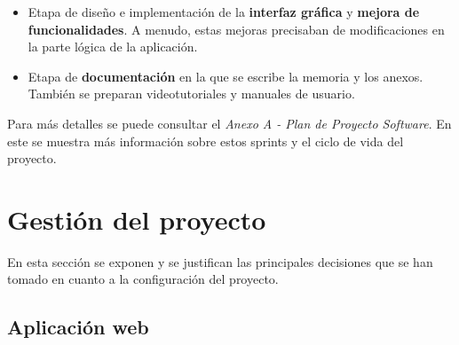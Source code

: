 \begin{itemize}
\begin{itemize}
			\item Configurar badges \footnote{Son placas que aportan información rápida sobre el estado del proyecto en ciertos aspectos como la cobertura, la calidad de código o el estado del proceso de CI/CD} para representar el estado del proyecto en cuanto a calidad de código, cobertura, despliegue y los trabajos de CI/CD.
		\end{itemize}
	\item Etapa  de diseño e implementación de la \textbf{interfaz gráfica} y \textbf{mejora de funcionalidades}. A menudo, estas mejoras precisaban de modificaciones en la parte lógica de la aplicación.
	\item Etapa de \textbf{documentación} en la que se escribe la memoria y los anexos. También se preparan videotutoriales y manuales de usuario.
\end{itemize}

Para más detalles se puede consultar el \textit{Anexo A - Plan de Proyecto Software}. En este se muestra más información sobre estos sprints y el ciclo de vida del proyecto.

\section{Gestión del proyecto}

En esta sección se exponen y se justifican las principales decisiones que se han tomado en cuanto a la configuración del proyecto.

\subsection{Aplicación web}


